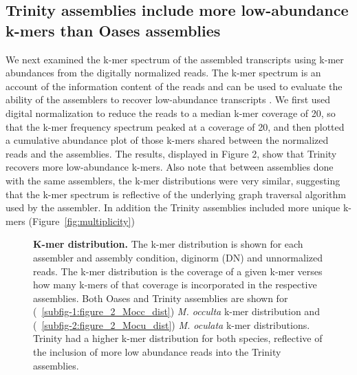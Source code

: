 \subsection{Trinity assemblies include more low-abundance k-mers than Oases assemblies}
We next examined the k-mer spectrum of the assembled transcripts using k-mer abundances from the digitally normalized reads. The k-mer spectrum is an account of the information content of the reads and can be used to evaluate the ability of the assemblers to recover low-abundance transcripts \citep{pop_genome_2009}.  We first used digital normalization to reduce the reads to a median k-mer coverage of 20, so that the k-mer frequency spectrum peaked at a coverage of 20, and then plotted a cumulative abundance plot of those k-mers shared between the normalized reads and the assemblies. The results, displayed in Figure 2, show that Trinity recovers more low-abundance k-mers.  Also note that between assemblies done with the same assemblers, the k-mer distributions were very similar, suggesting that the k-mer spectrum is reflective of the underlying graph traversal algorithm used by the assembler. In addition the Trinity assemblies included more unique k-mers (Figure~\ref{fig:multiplicity})

\begin{figure}[!ht]
	\hfill
	\caption{\textbf{K-mer distribution.} The k-mer distribution is shown for each assembler and assembly condition, diginorm (DN) and unnormalized reads. The k-mer distribution is the coverage of a given k-mer verses how many k-mers of that coverage is incorporated in the respective assemblies. Both Oases and Trinity assemblies are shown for (~\ref{subfig-1:figure_2_Mocc_dist}) \textit{M. occulta} k-mer distribution and  (~\ref{subfig-2:figure_2_Mocu_dist}) \textit{M. oculata} k-mer distributions. Trinity had a higher k-mer distribution for both species, reflective of the inclusion of more low abundance reads into the Trinity assemblies.}
	\label{fig:k-mer_spec}
\end{figure}

